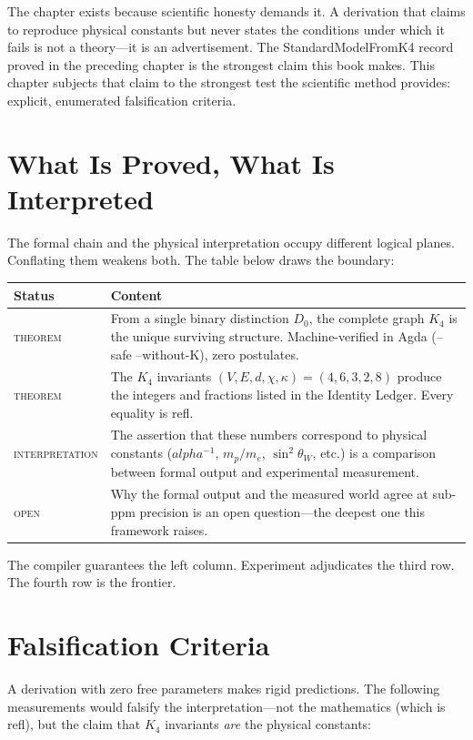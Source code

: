 \documentclass[11pt,a4paper]{book}
\def\alpha{alpha}%
\def\texttt#1{#1}%
\begin{document}
The chapter exists because scientific honesty demands it. A derivation that claims to reproduce physical constants but never states the conditions under which it fails is not a theory---it is an advertisement. The \texttt{StandardModelFromK4} record proved in the preceding chapter is the strongest claim this book makes. This chapter subjects that claim to the strongest test the scientific method provides: explicit, enumerated falsification criteria.

\section*{What Is Proved, What Is Interpreted}

The formal chain and the physical interpretation occupy different logical planes. Conflating them weakens both. The table below draws the boundary:

\begin{center}
\begin{tabular}{lp{10cm}}
\toprule
\textbf{Status} & \textbf{Content} \\
\midrule
\textsc{theorem} & From a single binary distinction $D_0$, the complete graph $K_4$ is the unique surviving structure. Machine-verified in Agda (\texttt{--safe --without-K}), zero postulates. \\
\textsc{theorem} & The $K_4$ invariants $(V,E,d,\chi,\kappa) = (4,6,3,2,8)$ produce the integers and fractions listed in the Identity Ledger. Every equality is \texttt{refl}. \\
\textsc{interpretation} & The assertion that these numbers correspond to physical constants ($\alpha^{-1}$, $m_p/m_e$, $\sin^2\!\theta_W$, etc.) is a comparison between formal output and experimental measurement. \\
\textsc{open} & Why the formal output and the measured world agree at sub-ppm precision is an open question---the deepest one this framework raises. \\
\bottomrule
\end{tabular}
\end{center}

The compiler guarantees the left column. Experiment adjudicates the third row. The fourth row is the frontier.

\section*{Falsification Criteria}

A derivation with zero free parameters makes rigid predictions. The following measurements would falsify the interpretation---not the mathematics (which is \texttt{refl}), but the claim that $K_4$ invariants \emph{are} the physical constants:
\end{document}
